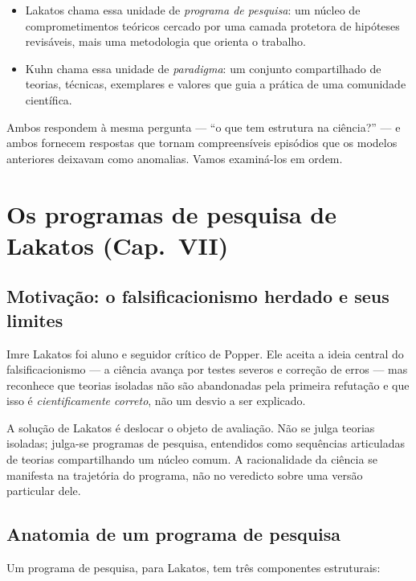 \documentclass[9pt,a4paper]{extarticle}
\newcommand{\impt}[1]{\textcolor{important}{#1}}
\theoremstyle{definition}
\begin{document}
\begin{itemize}
  \item \impt{Lakatos} chama essa unidade de \emph{programa de pesquisa}: um núcleo de comprometimentos teóricos cercado por uma camada protetora de hipóteses revisáveis, mais uma metodologia que orienta o trabalho.
  \item \impt{Kuhn} chama essa unidade de \emph{paradigma}: um conjunto compartilhado de teorias, técnicas, exemplares e valores que guia a prática de uma comunidade científica.
\end{itemize}

Ambos respondem à mesma pergunta --- ``o que tem estrutura na ciência?'' --- e ambos fornecem respostas que tornam compreensíveis episódios que os modelos anteriores deixavam como anomalias. Vamos examiná-los em ordem.

\section{Os programas de pesquisa de Lakatos (Cap.~VII)}

\subsection{Motivação: o falsificacionismo herdado e seus limites}

Imre Lakatos foi aluno e seguidor crítico de Popper. Ele aceita a ideia central do falsificacionismo --- a ciência avança por testes severos e correção de erros --- mas reconhece que \impt{teorias isoladas não são abandonadas pela primeira refutação} e que isso é \emph{cientificamente correto}, não um desvio a ser explicado.

A solução de Lakatos é deslocar o objeto de avaliação. Não se julga teorias isoladas; julga-se \impt{programas de pesquisa}, entendidos como sequências articuladas de teorias compartilhando um núcleo comum. A racionalidade da ciência se manifesta na \impt{trajetória} do programa, não no veredicto sobre uma versão particular dele.

\subsection{Anatomia de um programa de pesquisa}

Um programa de pesquisa, para Lakatos, tem três componentes estruturais:
\end{document}
